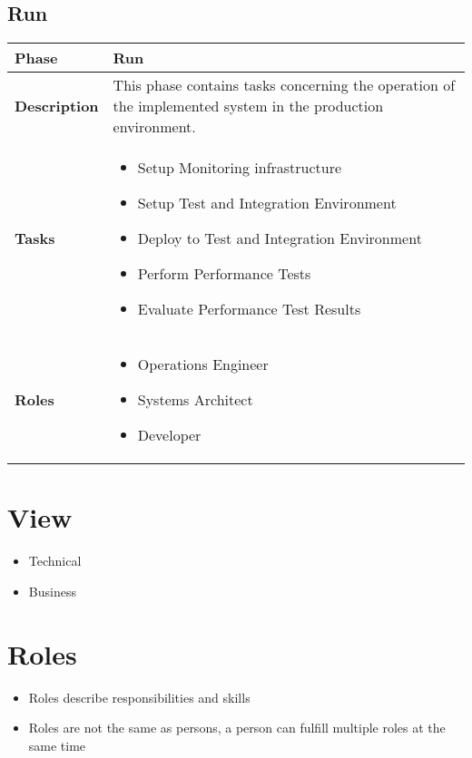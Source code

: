 \subsection{Run}
\begin{minipage}{\textwidth}
\label{table:ch6_View_Run}
\begin{tabular}
	{|m{2cm}|m{10cm}|} \hline \bfseries Phase & Run\\
	\hline \bfseries Description & This phase contains tasks concerning the operation of the implemented system in the production environment. \\
	\hline \bfseries Tasks & 
	\begin{itemize}
		\item Setup Monitoring infrastructure
		\item Setup Test and Integration Environment
		\item Deploy to Test and Integration Environment
		\item Perform Performance Tests
		\item Evaluate Performance Test Results
	\end{itemize}
	\\
	\hline \bfseries Roles &
	\begin{itemize}
		\item Operations Engineer
		\item Systems Architect
		\item Developer
	\end{itemize}
	\\
	\hline 
\end{tabular}
\end{minipage}

\section{View}
\begin{itemize}
	\item Technical
	\item Business
\end{itemize}

\section{Roles} 

\begin{itemize}
	\item Roles describe responsibilities and skills
	\item Roles are not the same as persons, a person can fulfill multiple roles at the same time
\end{itemize}

